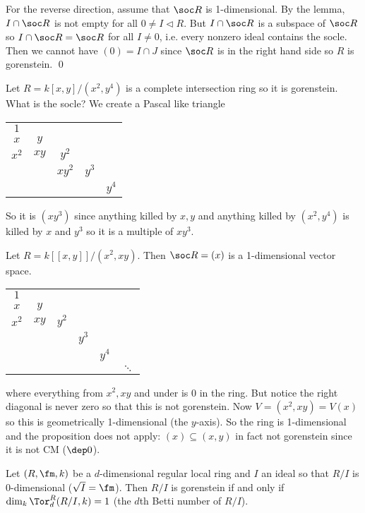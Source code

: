 For the reverse direction, assume that $\soc R$ is 1-dimensional. By the lemma, $I \cap \soc R$ is not empty for all $0 \neq I \lhd R$. But $I \cap \soc R$ is a subspace of $\soc R$ so $I \cap \soc R=\soc R$ for all $I \neq 0$, i.e. every nonzero ideal contains the socle. Then we cannot have $(0)=I \cap J$ since $\soc R$ is in the right hand side so $R$ is gorenstein. \qed \\

\begin{ex}
Let $R=k[x,y]/(x^2,y^4)$ is a complete intersection ring so it is gorenstein. What is the socle? We create a Pascal like triangle
\begin{center}
\begin{tabular}{ccccc}
$1$ & & & & \\
$x$ & $y$ & & &\\
$x^2$ & $xy$ & $y^2$ & & \\
 & & $xy^2$ & $y^3$ \\
  & & & & $y^4$ \\
\end{tabular}
\end{center}
So it is $(xy^3)$ since anything killed by $x,y$ and anything killed by $(x^2,y^4)$ is killed by $x$ and $y^3$ so it is a multiple of $xy^3$. 
\end{ex}

\begin{ex}
Let $R=k[[x,y]]/(x^2,xy)$. Then $\soc R=(x)$ is a 1-dimensional vector space. 
\begin{center}
\begin{tabular}{cccccc}
$1$ & & & & & \\
$x$ & $y$ & & & \\
$x^2$ & $xy$ & $y^2$ & & & \\
 & & & $y^3$ & & \\
 & & & & $y^4$ & \\
 & & & & & $\ddots$
\end{tabular}
\end{center}
where everything from $x^2,xy$ and under is $0$ in the ring. But notice the right diagonal is never zero so that this is not gorenstein. Now $V=(x^2,xy)=V(x)$ so this is geometrically 1-dimensional (the $y$-axis). So the ring is 1-dimensional and the proposition does not apply: $(x) \subseteq (x,y)$ in fact not gorenstein since it is not CM ($\dep 0$). 
\end{ex}

\begin{prop}
Let $(R,\fm,k)$ be a $d$-dimensional regular local ring and $I$ an ideal so that $R/I$ is 0-dimensional ($\sqrt{I}=\fm$). Then $R/I$ is gorenstein if and only if $\dim_k \Tor_d^R(R/I,k)=1$ (the $d$th Betti number of $R/I$). 
\end{prop}

